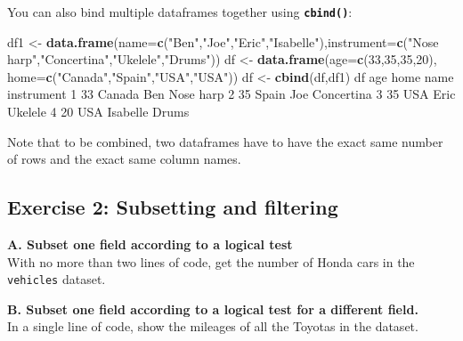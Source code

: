 \documentclass[
]{book}
\newenvironment{Shaded}{\begin{snugshade}}{\end{snugshade}}
\newcommand{\DataTypeTok}[1]{\textcolor[rgb]{0.13,0.29,0.53}{#1}}
\newcommand{\DecValTok}[1]{\textcolor[rgb]{0.00,0.00,0.81}{#1}}
\newcommand{\KeywordTok}[1]{\textcolor[rgb]{0.13,0.29,0.53}{\textbf{#1}}}
\newcommand{\NormalTok}[1]{#1}
\newcommand{\StringTok}[1]{\textcolor[rgb]{0.31,0.60,0.02}{#1}}
\begin{document}
You can also bind multiple dataframes together using \textbf{\texttt{cbind()}}:

\begin{Shaded}
\begin{Highlighting}[]
\NormalTok{df1 <-}\StringTok{ }\KeywordTok{data.frame}\NormalTok{(}\DataTypeTok{name=}\KeywordTok{c}\NormalTok{(}\StringTok{"Ben"}\NormalTok{,}\StringTok{"Joe"}\NormalTok{,}\StringTok{"Eric"}\NormalTok{,}\StringTok{"Isabelle"}\NormalTok{),}\DataTypeTok{instrument=}\KeywordTok{c}\NormalTok{(}\StringTok{"Nose harp"}\NormalTok{,}\StringTok{"Concertina"}\NormalTok{,}\StringTok{"Ukelele"}\NormalTok{,}\StringTok{"Drums"}\NormalTok{))}
\NormalTok{df <-}\StringTok{ }\KeywordTok{data.frame}\NormalTok{(}\DataTypeTok{age=}\KeywordTok{c}\NormalTok{(}\DecValTok{33}\NormalTok{,}\DecValTok{35}\NormalTok{,}\DecValTok{35}\NormalTok{,}\DecValTok{20}\NormalTok{), }\DataTypeTok{home=}\KeywordTok{c}\NormalTok{(}\StringTok{"Canada"}\NormalTok{,}\StringTok{"Spain"}\NormalTok{,}\StringTok{"USA"}\NormalTok{,}\StringTok{"USA"}\NormalTok{))}
\NormalTok{df <-}\StringTok{ }\KeywordTok{cbind}\NormalTok{(df,df1)}
\NormalTok{df}
\NormalTok{  age   home     name instrument}
\DecValTok{1}  \DecValTok{33}\NormalTok{ Canada      Ben  Nose harp}
\DecValTok{2}  \DecValTok{35}\NormalTok{  Spain      Joe Concertina}
\DecValTok{3}  \DecValTok{35}\NormalTok{    USA     Eric    Ukelele}
\DecValTok{4}  \DecValTok{20}\NormalTok{    USA Isabelle      Drums}
\end{Highlighting}
\end{Shaded}

Note that to be combined, two dataframes have to have the exact same number of rows and the exact same column names.

\hypertarget{exercise-2-subsetting-and-filtering}{%
\subsection*{Exercise 2: Subsetting and filtering}\label{exercise-2-subsetting-and-filtering}}

\textbf{A. Subset one field according to a logical test}\\
With no more than two lines of code, get the number of Honda cars in the \texttt{vehicles} dataset.

\textbf{B. Subset one field according to a logical test for a different field.}\\
In a single line of code, show the mileages of all the Toyotas in the dataset.
\end{document}
